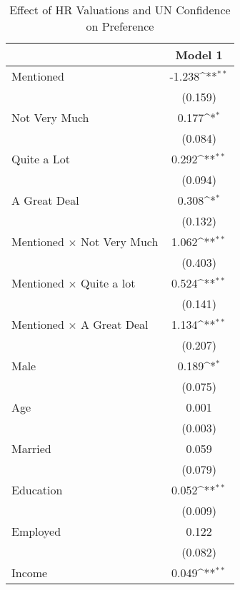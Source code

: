 \begin{table}[htbp]\centering
\fontsize{11}{11}\selectfont
\def\sym#1{\ifmmode^{#1}\else\(^{#1}\)\fi}
\caption{Effect of HR Valuations and UN Confidence on Preference}
\label{M1}
\begin{tabular}{l*{1}{c}}
\hline\hline
                    &\multicolumn{1}{c}{Model 1}        \\
\hline
Mentioned           &      -1.238\sym{**}\\
                    &     (0.159)        \\
[0.5em]
Not Very Much       &       0.177\sym{*} \\
                    &     (0.084)        \\
[0.5em]
Quite a Lot         &       0.292\sym{**}\\
                    &     (0.094)        \\
[0.5em]
A Great Deal        &       0.308\sym{*} \\
                    &     (0.132)        \\
[0.5em]
Mentioned $\times$ Not Very Much&       1.062\sym{**}\\
                    &     (0.403)        \\
[0.5em]
Mentioned $\times$ Quite a lot&       0.524\sym{**}\\
                    &     (0.141)        \\
[0.5em]
Mentioned $\times$ A Great Deal&       1.134\sym{**}\\
                    &     (0.207)        \\
[0.5em]
Male                &       0.189\sym{*} \\
                    &     (0.075)        \\
[0.5em]
Age                 &       0.001        \\
                    &     (0.003)        \\
[0.5em]
Married             &       0.059        \\
                    &     (0.079)        \\
[0.5em]
Education           &       0.052\sym{**}\\
                    &     (0.009)        \\
[0.5em]
Employed            &       0.122        \\
                    &     (0.082)        \\
[0.5em]
Income              &       0.049\sym{**}\\

\end{tabular}
\end{table}
